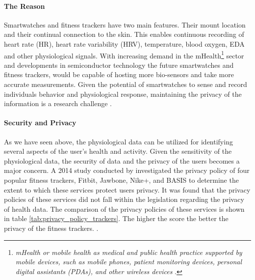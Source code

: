 \paragraph{The Reason} Smartwatches and fitness trackers have two main features. Their mount location and their continual connection to the skin. This enables continuous recording of heart rate (HR), heart rate variability (HRV), temperature, blood oxygen, EDA and other physiological signals. With increasing demand in the mHealth\footnote{\textit{mHealth or mobile
health as medical and public health practice supported by mobile devices, such as mobile phones, patient monitoring devices, personal digital assistants (PDAs), and other wireless devices} \cite{who_global_observatory_for_ehealth_mhealth:_2011}.} sector and developments in semiconductor technology the future smartwatches and fitness trackers, would be capable of hosting more bio-sensors and take more accurate measurements. Given the potential of smartwatches to sense and record individuals behavior and physiological response, maintaining the privacy of the information is a research challenge \cite{rawassizadeh_wearables:_2014}.

\paragraph{Security and Privacy} As we have seen above, the physiological data can be utilized for identifying several aspects of the user's health and activity. Given the sensitivity of the physiological data, the security of data and the privacy of the users becomes a major concern. A 2014 study conducted by \citeauthor{paul2014privacy} investigated the privacy policy of four popular fitness trackers, Fitbit, Jawbone, Nike+, and BASIS to determine the extent to which these services protect users privacy. It was found that the privacy policies of these services did not fall within the legislation regarding the privacy of health data. The comparison of the privacy policies of these services is shown in table \ref{tab:privacy_policy_trackers}. The higher the score the better the privacy of the fitness trackers. \cite{paul2014privacy}.

